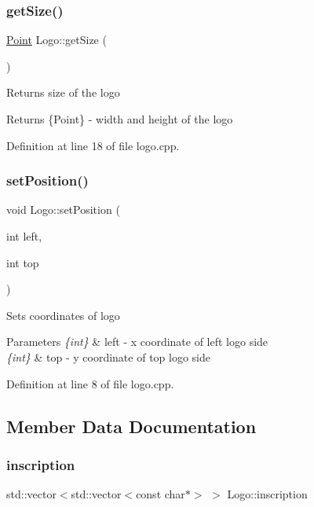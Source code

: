 \subsubsection{\texorpdfstring{getSize()}{getSize()}}
{\footnotesize\ttfamily \mbox{\hyperlink{common_8h_aa9cfdb80b4ca12013a2de8a3b9b97981}{Point}} Logo\+::get\+Size (\begin{DoxyParamCaption}{ }\end{DoxyParamCaption})}

Returns size of the logo \begin{DoxyReturn}{Returns}
\{Point\} -\/ width and height of the logo 
\end{DoxyReturn}


Definition at line 18 of file logo.\+cpp.

\mbox{\label{class_logo_a048b9474c23e659c94f590509376f198}} 
\subsubsection{\texorpdfstring{setPosition()}{setPosition()}}
{\footnotesize\ttfamily void Logo\+::set\+Position (\begin{DoxyParamCaption}\item[{int}]{left,  }\item[{int}]{top }\end{DoxyParamCaption})}

Sets coordinates of logo 
\begin{DoxyParams}{Parameters}
{\em \{int\}} & left -\/ x coordinate of left logo side \\
\hline
{\em \{int\}} & top -\/ y coordinate of top logo side \\
\hline
\end{DoxyParams}


Definition at line 8 of file logo.\+cpp.



\subsection{Member Data Documentation}
\mbox{\label{class_logo_aefd60c44e3a7b4648e9758117db11244}} 
\subsubsection{\texorpdfstring{inscription}{inscription}}
{\footnotesize\ttfamily std\+::vector$<$std\+::vector$<$const char$\ast$$>$ $>$ Logo\+::inscription\hspace{0.3cm}{\ttfamily [private]}}



